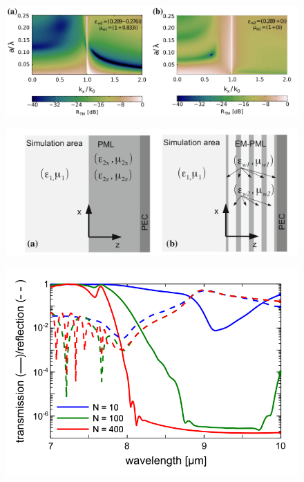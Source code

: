 \begin{figure}
\includegraphics[width=\textwidth]{images/pml/oqe_reflection_kat_simp.png}
\end{figure}

\begin{figure}
\includegraphics[width=\textwidth]{images/pml/oqe_schemat.png}
\end{figure}

\begin{figure}
\includegraphics[width=\textwidth]{images/pml/oqe_trans_refl.png}
\end{figure}


